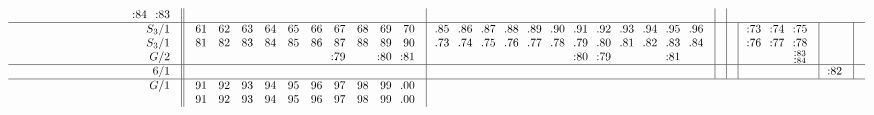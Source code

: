 \documentclass[12pt,a4paper]{amsart}
\begin{document}
\begin{align*}
\begin{array}{r||c|c|c|c|c|c|c}
\begin{array}{cccccccccccc}
&&&&&&&&&&\llap:84&\llap:83\\
  \end{array}
&&&\\\hline
    \begin{array}{r}
      S_3/1 \\ S_3/1 \\ G/2
    \end{array}
&
  \begin{array}{cccccccccc}
61&62&63&64&65&66&67&68&69&70\\
81&82&83&84&85&86&87&88&89&90\\
&&&&&&\llap:79&&\llap:80&\llap:81\\
  \end{array}
&
  \begin{array}{cccccccccccc}
\llap{.}85&\llap{.}86&\llap{.}87&\llap{.}88&\llap{.}89&\llap{.}90&\llap{.}91&\llap{.}92&\llap{.}93&\llap{.}94&\llap{.}95&\llap{.}96\\
\llap{.}73&\llap{.}74&\llap{.}75&\llap{.}76&\llap{.}77&\llap{.}78&\llap{.}79&\llap{.}80&\llap{.}81&\llap{.}82&\llap{.}83&\llap{.}84\\
&&&&&&\llap:80&\llap:79&&&\llap:81&\\
  \end{array}
&
&
&
  \begin{array}{ccc}
    \llap:73&\llap:74&\llap:75\\
    \llap:76&\llap:77&\llap:78\\
    &&^{\llap:83}_{\llap:84}\\
  \end{array}
&&\\\hline
    \begin{array}{r}
      6/1 \\
    \end{array}
&
&
&
&
&
&
  \begin{array}{c}
    \llap:82 \\
  \end{array}
&\\\hline
    \begin{array}{r}
      G/1 \\
      \\
    \end{array}
&
  \begin{array}{cccccccccc}
91&92&93&94&95&96&97&98&99&\llap{.}00\\
91&92&93&94&95&96&97&98&99&\llap{.}00\\
  \end{array}

\end{array}
\end{align*}
\end{document}

